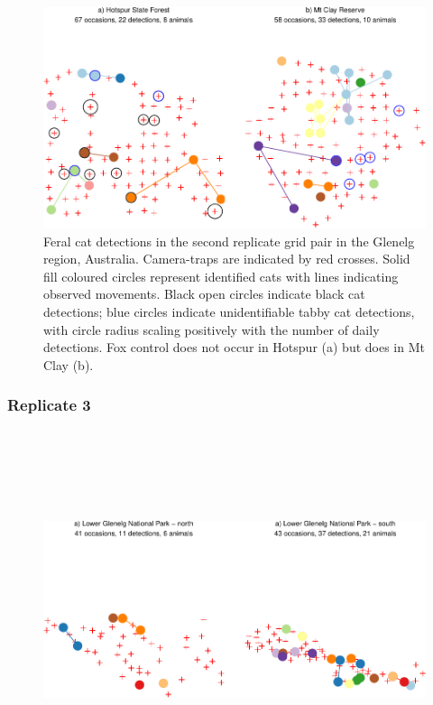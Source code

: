 \documentclass[11pt,a4paper,titlepage,twoside,openright]{style/unimelbthesis}
\begin{document}
\begin{mainmatter}
\(~\)

\(~\)
\begin{figure}

{\centering \includegraphics[width=1\linewidth]{figure/density-plot-ch-2-1} 

}

\caption{Feral cat detections in the second replicate grid pair in the Glenelg region, Australia. Camera-traps are indicated by red crosses. Solid fill coloured circles represent identified cats with lines indicating observed movements. Black open circles indicate black cat detections; blue circles indicate unidentifiable tabby cat detections, with circle radius scaling positively with the number of daily detections. Fox control does not occur in Hotspur (a) but does in Mt Clay (b).}\label{fig:density-plot-ch-2}
\end{figure}
\newpage

\hypertarget{replicate-3}{%
\subsubsection{Replicate 3}\label{replicate-3}}

\(~\)

\(~\)

\(~\)
\begin{figure}

{\centering \includegraphics[width=1\linewidth]{figure/density-plot-ch-3-1} 

}
\end{figure}
\end{mainmatter}
\end{document}

